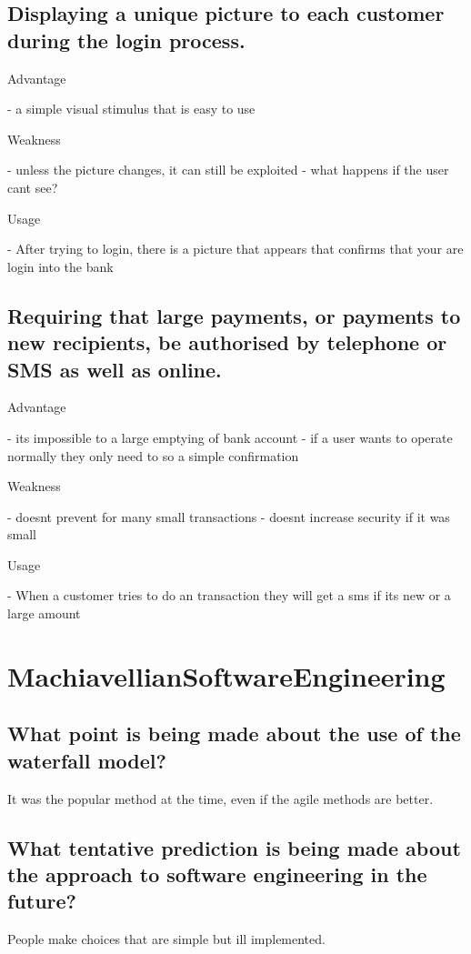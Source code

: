 \documentclass{article}
\begin{document}
\subsection[Unique Picture]{Displaying a unique picture to each customer during the login process.}
Advantage

- a simple visual stimulus that is easy to use

Weakness 

- unless the picture changes, it can still be exploited
- what happens if the user cant see?

Usage

- After trying to login, there is a picture that appears that confirms that your are login into the bank


\subsection[Telephonic Second Factor]{Requiring that large payments, or payments to new recipients, be authorised by telephone or SMS as well as online.}
Advantage

- its impossible to a large emptying of bank account
- if a user wants to operate normally they only need to so a simple confirmation

Weakness 

- doesnt prevent for many small transactions
- doesnt increase security if it was small

Usage

- When a customer tries to do an transaction they will get a sms if its new or a large amount


\section{MachiavellianSoftwareEngineering}


\subsection[Waterfall Model]{What point is being made about the use of the waterfall model?}
It was the popular method at the time, even if the agile methods are better. 

\subsection[Prediction]{What tentative prediction is being made about the approach to software engineering in the future?}
People make choices that are simple but ill implemented. 
\end{document}
